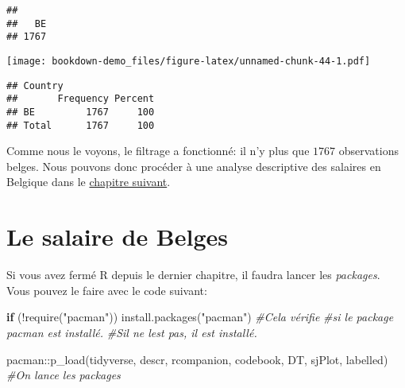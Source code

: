 \documentclass[
]{book}
\newenvironment{Shaded}{\begin{snugshade}}{\end{snugshade}}
\newcommand{\CommentTok}[1]{\textcolor[rgb]{0.56,0.35,0.01}{\textit{#1}}}
\newcommand{\ControlFlowTok}[1]{\textcolor[rgb]{0.13,0.29,0.53}{\textbf{#1}}}
\newcommand{\FunctionTok}[1]{\textcolor[rgb]{0.00,0.00,0.00}{#1}}
\newcommand{\NormalTok}[1]{#1}
\newcommand{\OtherTok}[1]{\textcolor[rgb]{0.56,0.35,0.01}{#1}}
\newcommand{\SpecialCharTok}[1]{\textcolor[rgb]{0.00,0.00,0.00}{#1}}
\newcommand{\StringTok}[1]{\textcolor[rgb]{0.31,0.60,0.02}{#1}}
\begin{document}
\begin{Shaded}
\end{Shaded}

\begin{verbatim}
## 
##   BE 
## 1767
\end{verbatim}

\begin{Shaded}
\end{Shaded}

\texttt{[image: bookdown-demo\_files/figure-latex/unnamed-chunk-44-1.pdf]}

\begin{verbatim}
## Country 
##       Frequency Percent
## BE         1767     100
## Total      1767     100
\end{verbatim}

Comme nous le voyons, le filtrage a fonctionné: il n'y plus que \(1767\) observations belges. Nous pouvons donc procéder à une analyse descriptive des salaires en Belgique dans le \protect\hyperlink{salaire_belge_stat_desc}{chapitre suivant}.

\hypertarget{salaire_belge_stat_desc}{%
\chapter{Le salaire de Belges}\label{salaire_belge_stat_desc}}

Si vous avez fermé R depuis le dernier chapitre, il faudra lancer les \emph{packages}. Vous pouvez le faire avec le code suivant:

\begin{Shaded}
\begin{Highlighting}[]
\ControlFlowTok{if}\NormalTok{ (}\SpecialCharTok{!}\FunctionTok{require}\NormalTok{(}\StringTok{"pacman"}\NormalTok{)) }\FunctionTok{install.packages}\NormalTok{(}\StringTok{"pacman"}\NormalTok{) }\CommentTok{\#Cela vérifie}
                             \CommentTok{\#si le package pacman est installé.}
                             \CommentTok{\#S\textquotesingle{}il ne l\textquotesingle{}est pas, il est installé.}

\NormalTok{pacman}\SpecialCharTok{::}\FunctionTok{p\_load}\NormalTok{(tidyverse, descr, rcompanion, codebook,}
\NormalTok{               DT, sjPlot, labelled) }\CommentTok{\#On lance les packages}
\end{Highlighting}
\end{Shaded}
\end{document}
